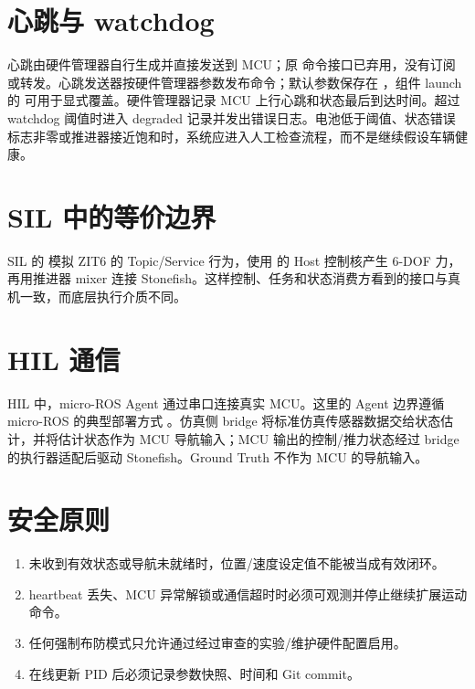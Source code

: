 \section{心跳与 watchdog}
心跳由硬件管理器自行生成并直接发送到 MCU；原  命令接口已弃用，没有订阅或转发。心跳发送器按硬件管理器参数发布命令；默认参数保存在 ，组件 launch 的  可用于显式覆盖。硬件管理器记录 MCU 上行心跳和状态最后到达时间。超过 watchdog 阈值时进入 degraded 记录并发出错误日志。电池低于阈值、状态错误标志非零或推进器接近饱和时，系统应进入人工检查流程，而不是继续假设车辆健康。

\section{SIL 中的等价边界}
SIL 的  模拟 ZIT6 的 Topic/Service 行为，使用  的 Host 控制核产生 6-DOF 力，再用推进器 mixer 连接 Stonefish。这样控制、任务和状态消费方看到的接口与真机一致，而底层执行介质不同。

\section{HIL 通信}
HIL 中，micro-ROS Agent 通过串口连接真实 MCU。这里的 Agent 边界遵循 micro-ROS 的典型部署方式 \cite{micro_ros}。仿真侧 bridge 将标准仿真传感器数据交给状态估计，并将估计状态作为 MCU 导航输入；MCU 输出的控制/推力状态经过 bridge 的执行器适配后驱动 Stonefish。Ground Truth 不作为 MCU 的导航输入。

\section{安全原则}
\begin{enumerate}
  \item 未收到有效状态或导航未就绪时，位置/速度设定值不能被当成有效闭环。
  \item heartbeat 丢失、MCU 异常解锁或通信超时时必须可观测并停止继续扩展运动命令。
  \item 任何强制布防模式只允许通过经过审查的实验/维护硬件配置启用。
  \item 在线更新 PID 后必须记录参数快照、时间和 Git commit。
\end{enumerate}
